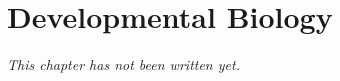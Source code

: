 \chapter{Developmental Biology}\label{ch:b1:development}


\emph{This chapter has not been written yet.}
